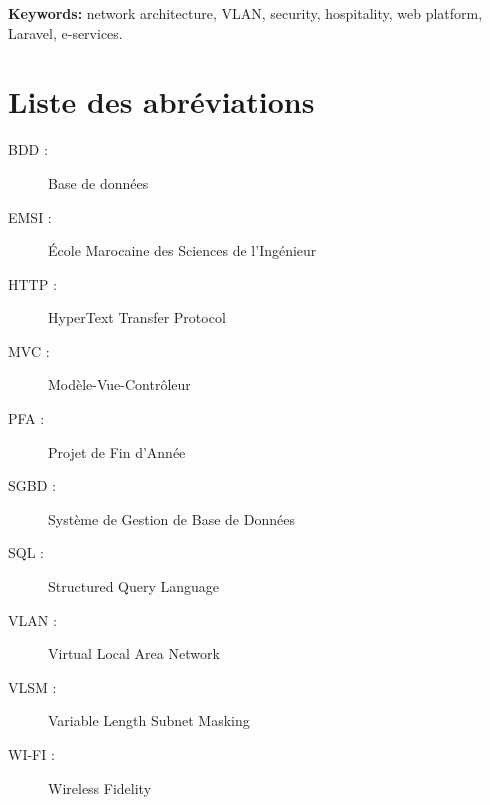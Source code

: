 \documentclass[12pt,a4paper]{report}
\begin{document}
\noindent\textbf{Keywords:} network architecture, VLAN, security, hospitality,
web platform, Laravel, e-services.

\clearpage


\chapter*{Liste des abréviations}

\begin{description}
    \item[BDD :] Base de données
    \item[EMSI :] École Marocaine des Sciences de l'Ingénieur
    \item[HTTP :] HyperText Transfer Protocol
    \item[MVC :] Modèle-Vue-Contrôleur
    \item[PFA :] Projet de Fin d'Année
    \item[SGBD :] Système de Gestion de Base de Données
    \item[SQL :] Structured Query Language
    \item[VLAN :] Virtual Local Area Network
    \item[VLSM :] Variable Length Subnet Masking
    \item[WI-FI :] Wireless Fidelity
\end{description}

\clearpage


\listoffigures
{}

\clearpage


\listoftables
{}

\clearpage


\tableofcontents

\clearpage

\end{document}
